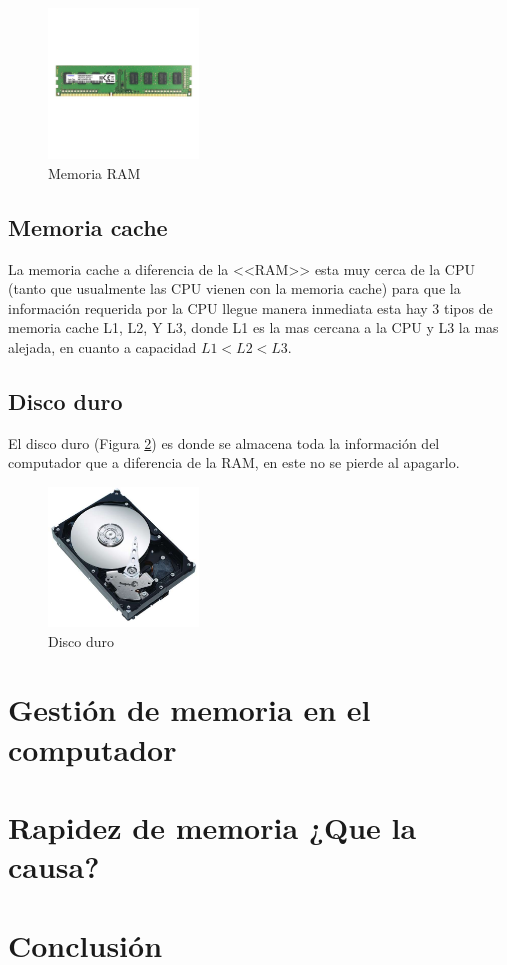 \documentclass{article}
\begin{document}
\begin{figure}[h]
\includegraphics[width=4cm]{Images/Ram.jpg}
\centering
\caption{Memoria RAM}
\label{fig:ram}
\end{figure}

\subsection{Memoria cache}
La memoria cache a diferencia de la <<RAM>> esta muy cerca de la CPU (tanto que usualmente las CPU vienen con la memoria cache) para que la información requerida por la CPU llegue manera inmediata esta hay 3 tipos de memoria cache L1, L2, Y L3, donde L1 es la mas cercana a la CPU y L3 la mas alejada, en cuanto a capacidad $L1 < L2 < L3$.



\subsection{Disco duro}
El disco duro (Figura \ref{fig:discoduro}) es donde se almacena toda la información del computador que a diferencia de la RAM, en este no se pierde al apagarlo.

\begin{figure}[h]
\includegraphics[width=4cm]{Images/discoduro.jpg}
\centering
\caption{Disco duro}
\label{fig:discoduro}
\end{figure}

\section{Gestión de memoria en el computador}

\section{Rapidez de memoria ¿Que la causa?}

\section{Conclusión} \label{conclulsion}



\end{document}
